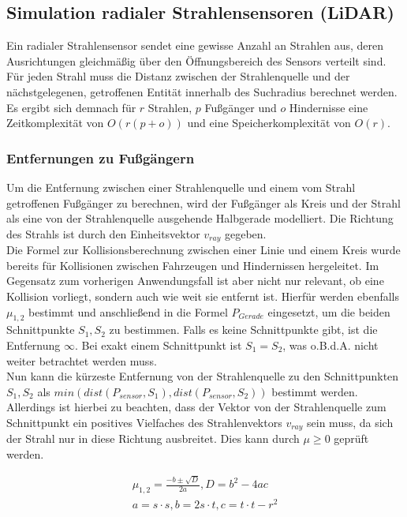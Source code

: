 \subsection{Simulation radialer Strahlensensoren (LiDAR)}
Ein radialer Strahlensensor sendet eine gewisse Anzahl an Strahlen aus, deren
Ausrichtungen gleichmäßig über den Öffnungsbereich des Sensors verteilt sind.
Für jeden Strahl muss die Distanz zwischen der Strahlenquelle und der
nächstgelegenen, getroffenen Entität innerhalb des Suchradius berechnet werden.
Es ergibt sich demnach für $r$ Strahlen, $p$ Fußgänger und $o$ Hindernisse eine
Zeitkomplexität von $O({r (p + o)})$ und eine Speicherkomplexität von $O(r)$.

\subsubsection{Entfernungen zu Fußgängern}
Um die Entfernung zwischen einer Strahlenquelle und einem vom Strahl getroffenen
Fußgänger zu berechnen, wird der Fußgänger als Kreis und der Strahl als eine von
der Strahlenquelle ausgehende Halbgerade modelliert. Die Richtung des Strahls
ist durch den Einheitsvektor $v_{ray}$ gegeben.\\

Die Formel zur Kollisionsberechnung zwischen einer Linie und einem Kreis wurde
bereits für Kollisionen zwischen Fahrzeugen und Hindernissen hergeleitet. Im Gegensatz
zum vorherigen Anwendungsfall ist aber nicht nur relevant, ob eine Kollision vorliegt,
sondern auch wie weit sie entfernt ist.
Hierfür werden ebenfalls $\mu_{1,2}$ bestimmt und anschließend in die Formel $P_{Gerade}$
eingesetzt, um die beiden Schnittpunkte $S_1, S_2$ zu bestimmen. Falls es
keine Schnittpunkte gibt, ist die Entfernung $\infty$. Bei exakt einem Schnittpunkt
ist $S_1 = S_2$, was o.B.d.A. nicht weiter betrachtet werden muss.\\

Nun kann die kürzeste Entfernung von der Strahlenquelle zu den Schnittpunkten
$S_1, S_2$ als  $min(dist(P_{sensor}, S_1), dist(P_{sensor}, S_2))$ bestimmt werden.
Allerdings ist hierbei zu beachten, dass der Vektor von der Strahlenquelle zum
Schnittpunkt ein positives Vielfaches des Strahlenvektors $v_{ray}$ sein muss,
da sich der Strahl nur in diese Richtung ausbreitet. Dies kann durch $\mu \ge 0$
geprüft werden.

\begin{equation}
\begin{aligned}
\mu_{1,2} = \frac{-b \pm \sqrt{D}}{2 a}, D = b^2 - 4 a c\\
a = s \cdot s, b = 2 s \cdot t, c = t \cdot t - r^2
\end{aligned}
\end{equation}


